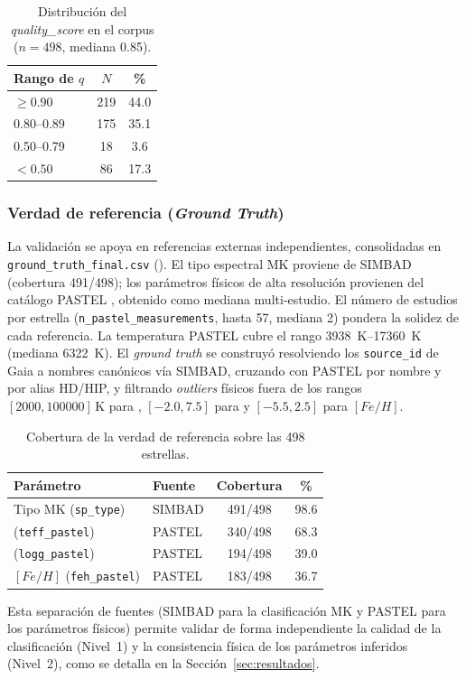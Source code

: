 \begin{table}[H]
  \centering
  \caption{Distribución del \emph{quality\_score} en el corpus ($n=498$,
  mediana \num{0.85}).}
  \label{tab:dist-quality}
  \begin{tabular}{lcc}
    \toprule
    Rango de $q$ & $N$ & \% \\
    \midrule
    $\ge 0.90$            & 219 & 44.0 \\
    \numrange{0.80}{0.89} & 175 & 35.1 \\
    \numrange{0.50}{0.79} & 18  & 3.6 \\
    $< 0.50$              & 86  & 17.3 \\
    \bottomrule
  \end{tabular}
\end{table}

\subsubsection{Verdad de referencia (\emph{Ground Truth})}
\label{sec:datos-gt}

La validación se apoya en referencias externas independientes, consolidadas en
\texttt{ground\_truth\_final.csv} (). El tipo espectral MK
proviene de SIMBAD (cobertura 491/498); los parámetros físicos de alta resolución
provienen del catálogo PASTEL \citep{pastel2016}, obtenido como mediana
multi-estudio. El número de estudios por estrella (\verb|n_pastel_measurements|, hasta
57, mediana 2) pondera la solidez de cada referencia. La temperatura PASTEL cubre el
rango \SIrange{3938}{17360}{\kelvin} (mediana \SI{6322}{\kelvin}). El \emph{ground truth}
se construyó resolviendo los \verb|source_id| de Gaia a nombres canónicos vía
SIMBAD, cruzando con PASTEL por nombre y por alias HD/HIP, y filtrando \emph{outliers}
físicos fuera de los rangos $[2000, 100000]\,\si{\kelvin}$ para \teff{},
$[-2.0, 7.5]$ para \logg{} y $[-5.5, 2.5]$ para $[Fe/H]$.

\begin{table}[H]
  \centering
  \caption{Cobertura de la verdad de referencia sobre las \num{498} estrellas.}
  \label{tab:gt-cobertura}
  \begin{tabular}{llcc}
    \toprule
    Parámetro & Fuente & Cobertura & \% \\
    \midrule
    Tipo MK (\verb|sp_type|)      & SIMBAD & 491/498 & 98.6 \\
    \teff{} (\verb|teff_pastel|)  & PASTEL & 340/498 & 68.3 \\
    \logg{} (\verb|logg_pastel|)  & PASTEL & 194/498 & 39.0 \\
    $[Fe/H]$ (\verb|feh_pastel|)  & PASTEL & 183/498 & 36.7 \\
    \bottomrule
  \end{tabular}
\end{table}

Esta separación de fuentes (SIMBAD para la clasificación MK y PASTEL para los
parámetros físicos) permite validar de forma independiente la calidad de la
clasificación (Nivel~1) y la consistencia física de los parámetros inferidos
(Nivel~2), como se detalla en la Sección~\ref{sec:resultados}.